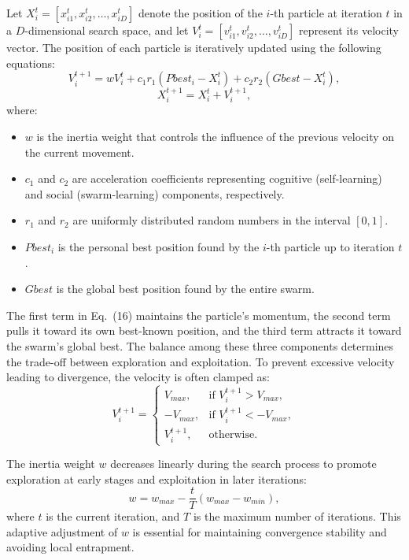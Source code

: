 \documentclass[a4paper,12pt]{article}
\begin{document}
Let $X_i^t = [x_{i1}^t, x_{i2}^t, \ldots, x_{iD}^t]$ denote the position of the $i$-th particle at iteration $t$ in a $D$-dimensional search space, and let $V_i^t = [v_{i1}^t, v_{i2}^t, \ldots, v_{iD}^t]$ represent its velocity vector. The position of each particle is iteratively updated using the following equations:
\begin{equation}
V_i^{t+1} = w V_i^{t} + c_1 r_1 (Pbest_i - X_i^{t}) + c_2 r_2 (Gbest - X_i^{t}),
\end{equation}
\begin{equation}
X_i^{t+1} = X_i^{t} + V_i^{t+1},
\end{equation}
where:
\begin{itemize}
    \item $w$ is the inertia weight that controls the influence of the previous velocity on the current movement.
    \item $c_1$ and $c_2$ are acceleration coefficients representing cognitive (self-learning) and social (swarm-learning) components, respectively.
    \item $r_1$ and $r_2$ are uniformly distributed random numbers in the interval $[0,1]$.
    \item $Pbest_i$ is the personal best position found by the $i$-th particle up to iteration $t$.
    \item $Gbest$ is the global best position found by the entire swarm.
\end{itemize}

The first term in Eq.~(16) maintains the particle's momentum, the second term pulls it toward its own best-known position, and the third term attracts it toward the swarm's global best. The balance among these three components determines the trade-off between exploration and exploitation. To prevent excessive velocity leading to divergence, the velocity is often clamped as:
\begin{equation}
V_i^{t+1} = 
\begin{cases}
V_{max}, & \text{if } V_i^{t+1} > V_{max}, \\
-V_{max}, & \text{if } V_i^{t+1} < -V_{max}, \\
V_i^{t+1}, & \text{otherwise.}
\end{cases}
\end{equation}

The inertia weight $w$ decreases linearly during the search process to promote exploration at early stages and exploitation in later iterations:
\begin{equation}
w = w_{max} - \frac{t}{T} (w_{max} - w_{min}),
\end{equation}
where $t$ is the current iteration, and $T$ is the maximum number of iterations. This adaptive adjustment of $w$ is essential for maintaining convergence stability and avoiding local entrapment.
\end{document}
